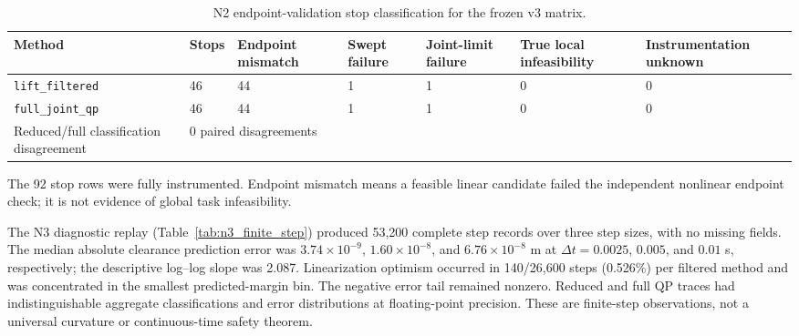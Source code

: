 \documentclass[preprint,12pt]{elsarticle}
\begin{document}
\begin{table}[t]
\centering
\small
\caption{N2 endpoint-validation stop classification for the frozen v3 matrix.}
\label{tab:n2_stop_classification}
\begin{tabularx}{\textwidth}{@{}p{}p{}p{}p{}p{}p{}X@{}}
\toprule
Method & Stops & Endpoint mismatch & Swept failure & Joint-limit failure & True local infeasibility & Instrumentation unknown \\
\midrule
\texttt{lift\_filtered} & 46 & 44 & 1 & 1 & 0 & 0 \\
\texttt{full\_joint\_qp} & 46 & 44 & 1 & 1 & 0 & 0 \\
\midrule
Reduced/full classification disagreement & \multicolumn{6}{l}{0 paired disagreements} \\
\bottomrule
\end{tabularx}
\vspace{1mm}
\parbox{0.94\textwidth}{\footnotesize The 92 stop rows were fully instrumented. Endpoint mismatch means a feasible linear candidate failed the independent nonlinear endpoint check; it is not evidence of global task infeasibility.}
\end{table}


The N3 diagnostic replay (Table~\ref{tab:n3_finite_step}) produced 53,200 complete step records over three step sizes, with no missing fields. The median absolute clearance prediction error was $3.74\times10^{-9}$, $1.60\times10^{-8}$, and $6.76\times10^{-8}$ m at $\Delta t=0.0025$, $0.005$, and $0.01$ s, respectively; the descriptive log--log slope was 2.087. Linearization optimism occurred in 140/26,600 steps (0.526\%) per filtered method and was concentrated in the smallest predicted-margin bin. The negative error tail remained nonzero. Reduced and full QP traces had indistinguishable aggregate classifications and error distributions at floating-point precision. These are finite-step observations, not a universal curvature or continuous-time safety theorem.
\end{document}
